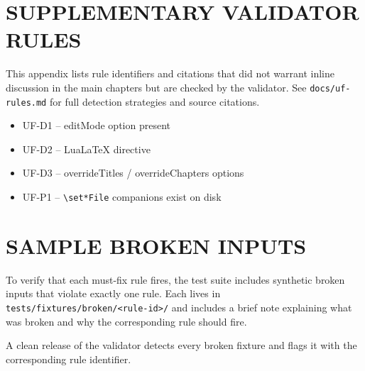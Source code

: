 
\chapter{SUPPLEMENTARY VALIDATOR RULES}\label{app:rules}

This appendix lists rule identifiers and citations that did not warrant
inline discussion in the main chapters but are checked by the
validator. See \texttt{docs/uf-rules.md} for full detection strategies
and source citations.

\begin{itemize}
    \item UF-D1 -- editMode option present
    \item UF-D2 -- LuaLaTeX directive
    \item UF-D3 -- overrideTitles / overrideChapters options
    \item UF-P1 -- \texttt{\textbackslash set*File} companions exist on disk
\end{itemize}

\chapter{SAMPLE BROKEN INPUTS}\label{app:fixtures}

To verify that each must-fix rule fires, the test suite includes
synthetic broken inputs that violate exactly one rule. Each lives in
\texttt{tests/fixtures/broken/<rule-id>/} and includes a brief note
explaining what was broken and why the corresponding rule should fire.

A clean release of the validator detects every broken fixture and
flags it with the corresponding rule identifier.

